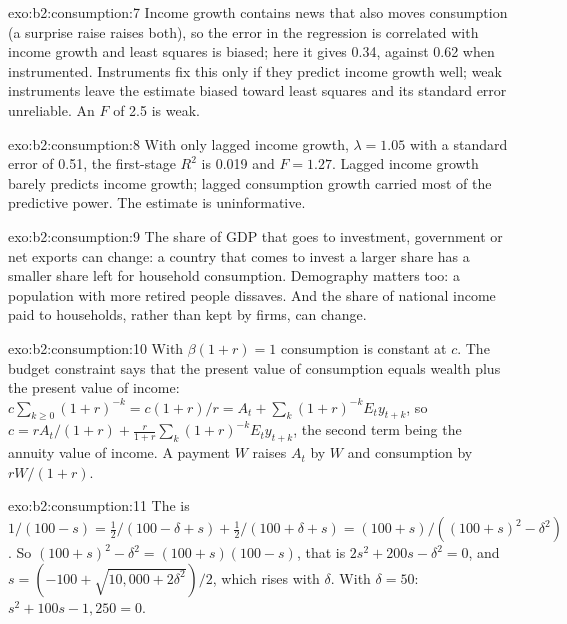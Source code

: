 \begin{solution}{exo:b2:consumption:7}
Income growth contains news that also moves consumption (a surprise raise raises both), so the error in the regression
is correlated with income growth and least squares is biased; here it gives 0.34, against 0.62 when instrumented. Instruments
fix this only if they predict income growth well; weak instruments leave the estimate biased toward least squares and
its standard error unreliable. An $F$ of 2.5 is weak.
\end{solution}

\begin{solution}{exo:b2:consumption:8}
With only lagged income growth, $\lambda = 1.05$ with a standard error of 0.51, the first-stage $R^2$ is 0.019 and $F = 1.27$. Lagged income
growth barely predicts income growth; lagged consumption growth carried most of the predictive power. The estimate is
uninformative.
\end{solution}

\begin{solution}{exo:b2:consumption:9}
The share of GDP that goes to investment, government or net exports can change: a country that comes to invest a larger share has a smaller share left for household consumption. Demography matters too: a population with more retired
people dissaves. And the share of national income paid to households, rather than kept by firms, can change.
\end{solution}

\begin{solution}{exo:b2:consumption:10}
With $\beta(1 + r) = 1$ consumption is constant at $c$. The budget constraint says that the present value of consumption equals wealth plus the
present value of income: $c\sum_{k \ge 0}(1 + r)^{-k} = c(1 + r)/r = A_t + \sum_k (1 + r)^{-k}E_t y_{t+k}$, so $c = rA_t/(1 + r) + \frac{r}{1 + r}\sum_k(1 + r)^{-k}E_t y_{t+k}$, the second term
being the annuity value of income. A payment $W$ raises $A_t$ by $W$ and consumption by $rW/(1 + r)$.
\end{solution}

\begin{solution}{exo:b2:consumption:11}
The  is $1/(100 - s) = \tfrac12/(100 - \delta + s) + \tfrac12/(100 + \delta + s) = (100 + s)/((100 + s)^2 - \delta^2)$. So $(100 + s)^2 - \delta^2 = (100 + s)(100 - s)$, that is $2s^2 + 200s - \delta^2 = 0$, and
$s = (-100 + \sqrt{10{,}000 + 2\delta^2})/2$, which rises with $\delta$. With $\delta = 50$: $s^2 + 100s - 1{,}250 = 0$.
\end{solution}

